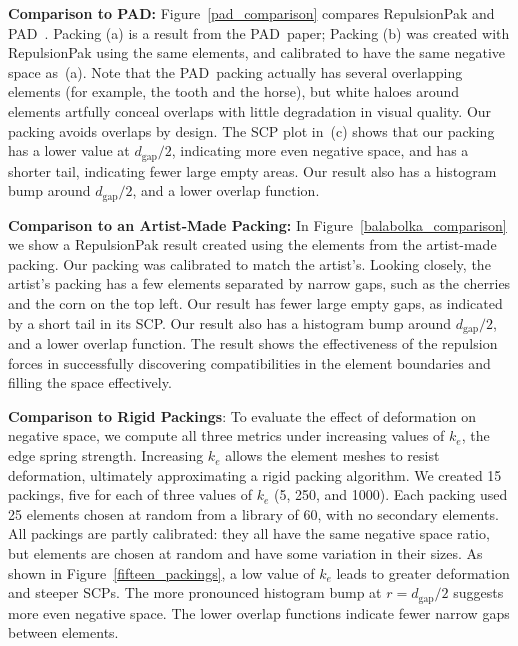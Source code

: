 \textbf{Comparison to PAD:} 
Figure~\ref{pad_comparison} compares
RepulsionPak and PAD~\cite{Kwan2016}.  Packing (a) is
a result from the PAD\ paper; Packing (b) was created with RepulsionPak using
the same elements, and calibrated to have the same negative space as~(a).
Note that the PAD\ packing actually has several overlapping elements
(for example, the tooth and the horse), but white haloes around
elements artfully conceal overlaps with little degradation in
visual quality.  Our packing avoids overlaps by design.
The SCP plot in~(c) shows that our packing has a lower value at $d_\mathrm{gap}/2$,
indicating more even negative space, and has a shorter tail,
indicating fewer large empty areas.
Our result also has a histogram bump around $d_\mathrm{gap}/2$, and 
a lower overlap function.


\textbf{Comparison to an Artist-Made Packing:} 
In Figure~\ref{balabolka_comparison} we show a RepulsionPak result created 
using the elements from the artist-made packing.
Our packing was calibrated to match the artist's.
Looking closely, the artist's packing has a few elements 
separated by narrow gaps, such as the cherries and the corn on the top left.
Our result has fewer large empty gaps, as indicated by a short tail
in its SCP.
Our result also has a histogram bump around $d_\mathrm{gap}/2$, and a lower overlap function.
The result shows the effectiveness of the repulsion forces in successfully
discovering compatibilities in the element boundaries and filling the space effectively.


\textbf{Comparison to Rigid Packings}: 
To evaluate the effect of deformation on negative space, we compute all three metrics under
increasing values of $k_e$, the edge spring strength.  Increasing $k_e$
allows the element meshes to resist deformation, ultimately
approximating a rigid packing algorithm.  We created 15 packings,
five for each of three values of $k_e$ (5, 250, and 1000).  Each packing
used 25 elements chosen at random from a library of 60, with
no secondary elements.  
All packings are partly calibrated: they all have the same negative
space ratio, but elements are chosen at random and have some
variation in their sizes.
As shown in Figure~\ref{fifteen_packings}, a low value of
$k_e$ leads to greater deformation and steeper SCPs.
The more pronounced histogram bump at $r=d_\mathrm{gap}/2$ suggests
more even negative space.
The lower overlap functions indicate fewer narrow gaps between elements.


